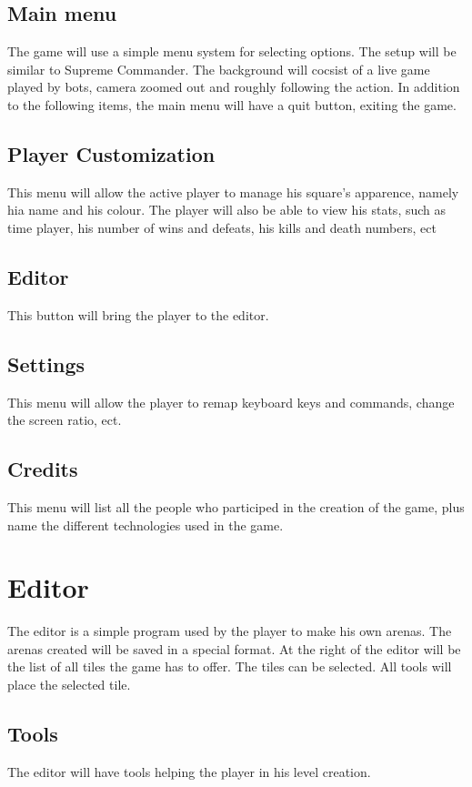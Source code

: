 \documentclass{article}
\begin{document}
\subsection{Main menu}
The game will use a simple menu system for selecting options. The setup will be similar to Supreme Commander. The background will cocsist of a live game played by bots, camera zoomed out and roughly following the action. In addition to the following items, the main menu will have a quit button, exiting the game.

\subsection{Player Customization}
This menu will allow the active player to manage his square's apparence, namely hia name and his colour. The player will also be able to view his stats, such as time player, his number of wins and defeats, his kills and death numbers, ect

\subsection{Editor}
This button will bring the player to the editor.

\subsection{Settings}
This menu will allow the player to remap keyboard keys and commands, change the screen ratio, ect.

\subsection{Credits}
This menu will list all the people who participed in the creation of the game, plus name the different technologies used in the game.

\section{Editor}
The editor is a simple program used by the player to make his own arenas. The arenas created will be saved in a special format. At the right of the editor will be the list of all tiles the game has to offer. The tiles can be selected. All tools will place the selected tile.

\subsection{Tools}
The editor will have tools helping the player in his level creation.
\end{document}
